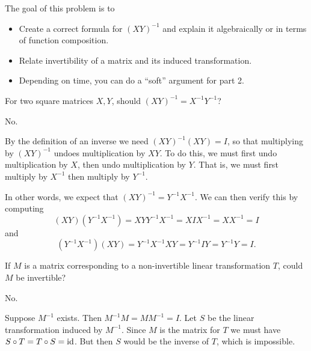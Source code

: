 \documentclass{problemset}
\newcommand{\bookonlynewpage}{\begin{bookonly}\newpage\end{bookonly}}
\begin{document}
	\bookonlynewpage
	\question
	\begin{annotation}
		\begin{goals}

			The goal of this problem is to
			\begin{itemize}
				\item Create a correct formula for $(XY)^{-1}$ and
					explain it algebraically or in terms of 
					function composition.
				\item Relate invertibility of a matrix and its induced transformation.
			\end{itemize}
		\end{goals}

		\begin{notes}
			\begin{itemize}
				\item Depending on time, you can do a ``soft'' argument for part 2.
			\end{itemize}
		\end{notes}
	\end{annotation}
	\begin{parts}
		\item For two square matrices $X,Y$, should $(XY)^{-1}=X^{-1}Y^{-1}$?
			\begin{solution}
				No.

				By the definition of an inverse we need $(XY)^{-1}(XY)=I$, so
				that multiplying by $(XY)^{-1}$ undoes multiplication
				by $XY$. To do this, we must first undo multiplication by $X$,
				then undo multiplication by $Y$. That is, we must first multiply
				by $X^{-1}$ then multiply by $Y^{-1}$.

				In other words, we expect that $(XY)^{-1} = Y^{-1}X^{-1}$. We can
				then verify this by computing
				\[
					(XY)(Y^{-1}X^{-1}) = XYY^{-1}X^{-1} = XIX^{-1} = XX^{-1} = I
				\]
				and
				\[
					(Y^{-1}X^{-1})(XY) = Y^{-1}X^{-1}XY = Y^{-1}IY = Y^{-1}Y = I.
				\]
			\end{solution}
		\item If $M$ is a matrix corresponding to a non-invertible linear transformation $T$,
			could $M$ be invertible?
			\begin{solution}
				No.

				Suppose $M^{-1}$ exists. Then $M^{-1}M=MM^{-1}=I$.
				Let $S$ be the linear transformation induced by $M^{-1}$.
				Since $M$ is the matrix for $T$ we must have $S\circ T=T\circ S=\operatorname{id}$. But
				then $S$ would be the inverse of $T$, which is impossible.
			\end{solution}
	\end{parts}
\end{document}
